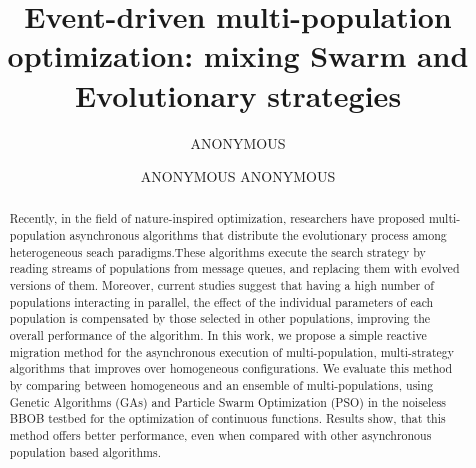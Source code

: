 \documentclass[sigconf]{acmart}
\begin{document}
\title{Event-driven multi-population optimization: mixing Swarm and Evolutionary strategies}

\author{ANONYMOUS}


\author{ANONYMOUS ANONYMOUS}




\renewcommand{\shortauthors}{ANONYMOUS et al.}

\begin{abstract}
  Recently, in the field of nature-inspired optimization, 
  researchers have proposed multi-population asynchronous 
  algorithms that distribute the evolutionary process among 
  heterogeneous seach paradigms.These algorithms execute 
  the search strategy by reading streams of populations 
  from message queues, and replacing them with evolved versions of them.
  Moreover, current studies suggest that having a high number of populations
  interacting in parallel, the effect  of the individual parameters
  of each population is compensated by those selected in other
  populations, 
  improving the overall performance of the algorithm. In this work,
  we propose a simple reactive migration method for the 
  asynchronous execution of multi-population, multi-strategy 
  algorithms that improves over homogeneous configurations.
  We evaluate this method by comparing between %
  homogeneous and an ensemble of 
  multi-populations, using Genetic Algorithms (GAs) and Particle 
  Swarm Optimization (PSO) in the noiseless BBOB testbed for 
  the optimization of continuous functions. Results show,
  that this method offers better performance, even when compared
  with other asynchronous population based algorithms. 
\end{abstract}
\end{document}
